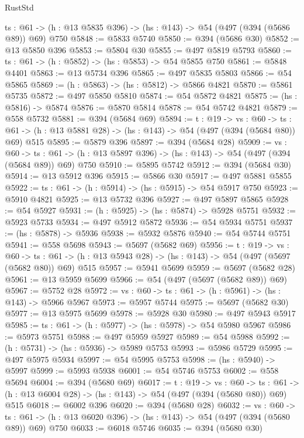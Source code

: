 \begin{lexlean}{RustStd}
\begin{coremodule}
  {ts : @61} -> (h : @13 @5835 @396) -> (hs : @143) -> @54 (@497 (@394 (@5686 @89)) @69) @750
@5848 := @5833 @5740
@5850 := @394 (@5686 @30)
@5852 := @13 @5850 @396
@5853 := @5804 @30
@5855 := @497 @5819 @5793
@5860 := {ts : @61} -> (h : @5852) -> (hs : @5853) -> @54 @5855 @750
@5861 := @5848 @4401
@5863 := @13 @5734 @396
@5865 := @497 @5835 @5803
@5866 := @54 @5865
@5869 := (h : @5863) -> (hs : @5812) -> @5866 @4821
@5870 := @5861 @5735
@5872 := @497 @5850 @5810
@5874 := @54 @5872 @4821
@5875 := (hs : @5816) -> @5874
@5876 := @5870 @5814
@5878 := @54 @5742 @4821
@5879 := @558 @5732
@5881 := @394 (@5684 @69)
@5894 := {t : @19} ->
  {vs : @60} ->
  {ts : @61} -> (h : @13 @5881 @28) -> (hs : @143) -> @54 (@497 (@394 (@5684 @80)) @69) @515
@5895 := @5879 @396
@5897 := @394 (@5684 @28)
@5909 := {vs : @60} ->
  {ts : @61} -> (h : @13 @5897 @396) -> (hs : @143) -> @54 (@497 (@394 (@5684 @89)) @69) @750
@5910 := @5895 @5742
@5912 := @394 (@5684 @30)
@5914 := @13 @5912 @396
@5915 := @5866 @30
@5917 := @497 @5881 @5855
@5922 := {ts : @61} -> (h : @5914) -> (hs : @5915) -> @54 @5917 @750
@5923 := @5910 @4821
@5925 := @13 @5732 @396
@5927 := @497 @5897 @5865
@5928 := @54 @5927
@5931 := (h : @5925) -> (hs : @5874) -> @5928 @5751
@5932 := @5923 @5733
@5934 := @497 @5912 @5872
@5936 := @54 @5934 @5751
@5937 := (hs : @5878) -> @5936
@5938 := @5932 @5876
@5940 := @54 @5744 @5751
@5941 := @558 @5698
@5943 := @5697 (@5682 @69)
@5956 := {t : @19} ->
  {vs : @60} ->
  {ts : @61} -> (h : @13 @5943 @28) -> (hs : @143) -> @54 (@497 (@5697 (@5682 @80)) @69) @515
@5957 := @5941 @5699
@5959 := @5697 (@5682 @28)
@5961 := @13 @5959 @5699
@5966 := @54 (@497 (@5697 (@5682 @89)) @69)
@5967 := @5752 @28
@5972 := {vs : @60} -> {ts : @61} -> (h : @5961) -> (hs : @143) -> @5966 @5967
@5973 := @5957 @5744
@5975 := @5697 (@5682 @30)
@5977 := @13 @5975 @5699
@5978 := @5928 @30
@5980 := @497 @5943 @5917
@5985 := {ts : @61} -> (h : @5977) -> (hs : @5978) -> @54 @5980 @5967
@5986 := @5973 @5751
@5988 := @497 @5959 @5927
@5989 := @54 @5988
@5992 := (h : @5731) -> (hs : @5936) -> @5989 @5753
@5993 := @5986 @5729
@5995 := @497 @5975 @5934
@5997 := @54 @5995 @5753
@5998 := (hs : @5940) -> @5997
@5999 := @5993 @5938
@6001 := @54 @5746 @5753
@6002 := @558 @5694
@6004 := @394 (@5680 @69)
@6017 := {t : @19} ->
  {vs : @60} ->
  {ts : @61} -> (h : @13 @6004 @28) -> (hs : @143) -> @54 (@497 (@394 (@5680 @80)) @69) @515
@6018 := @6002 @396
@6020 := @394 (@5680 @28)
@6032 := {vs : @60} ->
  {ts : @61} -> (h : @13 @6020 @396) -> (hs : @143) -> @54 (@497 (@394 (@5680 @89)) @69) @750
@6033 := @6018 @5746
@6035 := @394 (@5680 @30)

\end{coremodule}
\end{lexlean}
